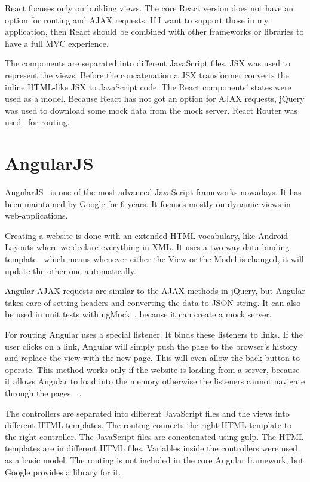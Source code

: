 React focuses only on building views. The core React version does not have an option for routing and AJAX requests. If I want to support those in my application, then React should be combined with other frameworks or libraries to have a full MVC experience.

The components are separated into different JavaScript files. JSX was used to represent the views. Before the concatenation a JSX transformer converts the inline HTML-like JSX to JavaScript code. The React components' states were used as a model. Because React has not got an option for AJAX requests, jQuery was used to download some mock data from the mock server. React Router was used~\cite{React-router} for routing. 

\section{AngularJS}

AngularJS~\cite{Angular} is one of the most advanced JavaScript frameworks nowadays.  It has been maintained by Google for 6 years. It focuses mostly on dynamic views in web-applications. 

Creating a website is done with an extended HTML vocabulary, like Android Layouts where we declare everything in XML.  It uses a two-way data binding template~\cite{Angular-Developer-DataBinding} which means whenever either the View or the Model is changed, it will update the other one automatically.

Angular AJAX requests are similar to the AJAX methods in jQuery, but Angular takes care of setting headers and converting the data to JSON string. It can also be used in unit tests with ngMock~\cite{Angular-AJAX}, because it can create a mock server. 

For routing Angular uses a special listener. It binds these listeners to links. If the user clicks on a link, Angular will simply push the page to the browser's history and replace the view with the new page. This will even allow the back button to operate. This method works only if the website is loading from a server, because it allows Angular to load into the memory otherwise the listeners cannot navigate through the pages~\cite{Angular-Location}~\cite{Angular-Location2}.

The controllers are separated into different JavaScript files and the views into different HTML templates. The routing connects the right HTML template to the right controller. The JavaScript files are concatenated using gulp. The HTML templates are in different HTML files. Variables inside the controllers were used as a basic model. The routing is not included in the core Angular framework, but Google provides a library for it.

